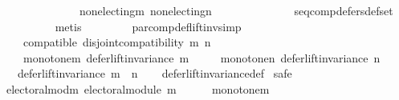 \begin{isabellebody}
\ \ \ \ \ \ \ \ \ \ \ \ \ \ non{\isacharunderscore}{\kern0pt}electing{\isacharunderscore}{\kern0pt}m\ non{\isacharunderscore}{\kern0pt}electing{\isacharunderscore}{\kern0pt}n\isanewline
\ \ \ \ \ \ \ \ \ \ \ \ \ \ seq{\isacharunderscore}{\kern0pt}comp{\isacharunderscore}{\kern0pt}defers{\isacharunderscore}{\kern0pt}def{\isacharunderscore}{\kern0pt}set\isanewline
\ \ \ \ \ \ \ \ \isamarkupfalse%
\ metis\isanewline
\ \ \ \ \isamarkupfalse%
\isanewline
\ \ \isamarkupfalse%
\isanewline
{}\isamarkupfalse%
%
\endisatagproof
{\isafoldproof}%
%
\isadelimproof
\isanewline
%
\endisadelimproof
\isanewline
\isanewline
{}\isamarkupfalse%
\ par{\isacharunderscore}{\kern0pt}comp{\isacharunderscore}{\kern0pt}def{\isacharunderscore}{\kern0pt}lift{\isacharunderscore}{\kern0pt}inv{\isacharbrackleft}{\kern0pt}simp{\isacharbrackright}{\kern0pt}{\isacharcolon}{\kern0pt}\isanewline
\ \ \isanewline
\ \ \ \ compatible{\isacharcolon}{\kern0pt}\ {\isachardoublequoteopen}disjoint{\isacharunderscore}{\kern0pt}compatibility\ m\ n{\isachardoublequoteclose}\ \isanewline
\ \ \ \ monotone{\isacharunderscore}{\kern0pt}m{\isacharcolon}{\kern0pt}\ {\isachardoublequoteopen}defer{\isacharunderscore}{\kern0pt}lift{\isacharunderscore}{\kern0pt}invariance\ m{\isachardoublequoteclose}\ \isanewline
\ \ \ \ monotone{\isacharunderscore}{\kern0pt}n{\isacharcolon}{\kern0pt}\ {\isachardoublequoteopen}defer{\isacharunderscore}{\kern0pt}lift{\isacharunderscore}{\kern0pt}invariance\ n{\isachardoublequoteclose}\isanewline
\ \ \ {\isachardoublequoteopen}defer{\isacharunderscore}{\kern0pt}lift{\isacharunderscore}{\kern0pt}invariance\ {\isacharparenleft}{\kern0pt}m\ {\isasymparallel}\isactrlsub {\isasymup}\ n{\isacharparenright}{\kern0pt}{\isachardoublequoteclose}\isanewline
%
\isadelimproof
\ \ %
\endisadelimproof
%
\isatagproof
{}\isamarkupfalse%
\ defer{\isacharunderscore}{\kern0pt}lift{\isacharunderscore}{\kern0pt}invariance{\isacharunderscore}{\kern0pt}def\isanewline
{}\isamarkupfalse%
\ {\isacharparenleft}{\kern0pt}safe{\isacharparenright}{\kern0pt}\isanewline
\ \ \isamarkupfalse%
\ electoral{\isacharunderscore}{\kern0pt}mod{\isacharunderscore}{\kern0pt}m{\isacharcolon}{\kern0pt}\ {\isachardoublequoteopen}electoral{\isacharunderscore}{\kern0pt}module\ m{\isachardoublequoteclose}\isanewline
\ \ \ \ \isamarkupfalse%
\ monotone{\isacharunderscore}{\kern0pt}m\isanewline
\ \ \ \ \isamarkupfalse%

\end{isabellebody}
